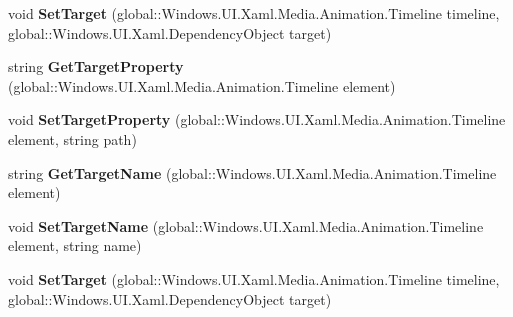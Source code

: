 \begin{DoxyCompactItemize}
\mbox{\label{interface_windows_1_1_u_i_1_1_xaml_1_1_media_1_1_animation_1_1_i_storyboard_statics_ab3c5f3b6891c82842a641da8d1254fdc}} 
void {\bfseries Set\+Target} (global\+::\+Windows.\+U\+I.\+Xaml.\+Media.\+Animation.\+Timeline timeline, global\+::\+Windows.\+U\+I.\+Xaml.\+Dependency\+Object target)
\item 
\mbox{\label{interface_windows_1_1_u_i_1_1_xaml_1_1_media_1_1_animation_1_1_i_storyboard_statics_a62e7f08dda4730dc9bec8462837a7476}} 
string {\bfseries Get\+Target\+Property} (global\+::\+Windows.\+U\+I.\+Xaml.\+Media.\+Animation.\+Timeline element)
\item 
\mbox{\label{interface_windows_1_1_u_i_1_1_xaml_1_1_media_1_1_animation_1_1_i_storyboard_statics_ae3787739563318b3f3282dfec151be5c}} 
void {\bfseries Set\+Target\+Property} (global\+::\+Windows.\+U\+I.\+Xaml.\+Media.\+Animation.\+Timeline element, string path)
\item 
\mbox{\label{interface_windows_1_1_u_i_1_1_xaml_1_1_media_1_1_animation_1_1_i_storyboard_statics_afeb68a7d3fc61bb8fdbba68aab2f0d4f}} 
string {\bfseries Get\+Target\+Name} (global\+::\+Windows.\+U\+I.\+Xaml.\+Media.\+Animation.\+Timeline element)
\item 
\mbox{\label{interface_windows_1_1_u_i_1_1_xaml_1_1_media_1_1_animation_1_1_i_storyboard_statics_ad1745f5d472fa822ee6f34d92a55ae55}} 
void {\bfseries Set\+Target\+Name} (global\+::\+Windows.\+U\+I.\+Xaml.\+Media.\+Animation.\+Timeline element, string name)
\item 
\mbox{\label{interface_windows_1_1_u_i_1_1_xaml_1_1_media_1_1_animation_1_1_i_storyboard_statics_ab3c5f3b6891c82842a641da8d1254fdc}} 
void {\bfseries Set\+Target} (global\+::\+Windows.\+U\+I.\+Xaml.\+Media.\+Animation.\+Timeline timeline, global\+::\+Windows.\+U\+I.\+Xaml.\+Dependency\+Object target)

\end{DoxyCompactItemize}
